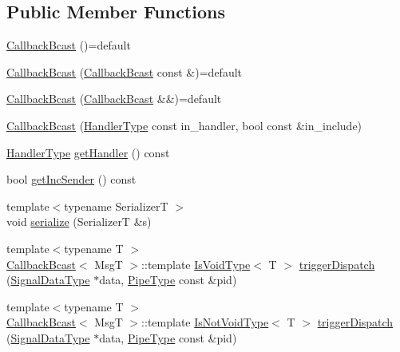 \subsection*{Public Member Functions}
\begin{DoxyCompactItemize}
\item 
\hyperlink{structvt_1_1pipe_1_1callback_1_1_callback_bcast_adbfcc31e986a2aed709b8517e0e978ae}{Callback\+Bcast} ()=default
\item 
\hyperlink{structvt_1_1pipe_1_1callback_1_1_callback_bcast_a7a711d532fcf9c8c91ab984e9848e2f0}{Callback\+Bcast} (\hyperlink{structvt_1_1pipe_1_1callback_1_1_callback_bcast}{Callback\+Bcast} const \&)=default
\item 
\hyperlink{structvt_1_1pipe_1_1callback_1_1_callback_bcast_af90721bd868d3d3e4140db4bee5da39f}{Callback\+Bcast} (\hyperlink{structvt_1_1pipe_1_1callback_1_1_callback_bcast}{Callback\+Bcast} \&\&)=default
\item 
\hyperlink{structvt_1_1pipe_1_1callback_1_1_callback_bcast_a57451443d73bc8cc4deb3649ec61a776}{Callback\+Bcast} (\hyperlink{namespacevt_af64846b57dfcaf104da3ef6967917573}{Handler\+Type} const in\+\_\+handler, bool const \&in\+\_\+include)
\item 
\hyperlink{namespacevt_af64846b57dfcaf104da3ef6967917573}{Handler\+Type} \hyperlink{structvt_1_1pipe_1_1callback_1_1_callback_bcast_a7585164f2854f2af3f23af0e0468e0c8}{get\+Handler} () const
\item 
bool \hyperlink{structvt_1_1pipe_1_1callback_1_1_callback_bcast_a44fca909dc3216da6c84a6277649fa6e}{get\+Inc\+Sender} () const
\item 
{\footnotesize template$<$typename SerializerT $>$ }\\void \hyperlink{structvt_1_1pipe_1_1callback_1_1_callback_bcast_a2337a0d2bda968f7ab1e4c85c3dbe67a}{serialize} (SerializerT \&s)
\item 
{\footnotesize template$<$typename T $>$ }\\\hyperlink{structvt_1_1pipe_1_1callback_1_1_callback_bcast}{Callback\+Bcast}$<$ MsgT $>$\+::template \hyperlink{structvt_1_1pipe_1_1callback_1_1_callback_bcast_a3ca08c23824cfac76b837311a1d2c929}{Is\+Void\+Type}$<$ T $>$ \hyperlink{structvt_1_1pipe_1_1callback_1_1_callback_bcast_aa5c6f297ec676eb2dda4d4b6238fa282}{trigger\+Dispatch} (\hyperlink{structvt_1_1pipe_1_1callback_1_1_callback_bcast_aaf994b71056001334d30d74fa9c958f9}{Signal\+Data\+Type} $\ast$data, \hyperlink{namespacevt_ac9852acda74d1896f48f406cd72c7bd3}{Pipe\+Type} const \&pid)
\item 
{\footnotesize template$<$typename T $>$ }\\\hyperlink{structvt_1_1pipe_1_1callback_1_1_callback_bcast}{Callback\+Bcast}$<$ MsgT $>$\+::template \hyperlink{structvt_1_1pipe_1_1callback_1_1_callback_bcast_a3f5efa2edf7f4c47fe047e086e63a477}{Is\+Not\+Void\+Type}$<$ T $>$ \hyperlink{structvt_1_1pipe_1_1callback_1_1_callback_bcast_aad21dba24d76c98715a077f8e2b885ff}{trigger\+Dispatch} (\hyperlink{structvt_1_1pipe_1_1callback_1_1_callback_bcast_aaf994b71056001334d30d74fa9c958f9}{Signal\+Data\+Type} $\ast$data, \hyperlink{namespacevt_ac9852acda74d1896f48f406cd72c7bd3}{Pipe\+Type} const \&pid)
\end{DoxyCompactItemize}
